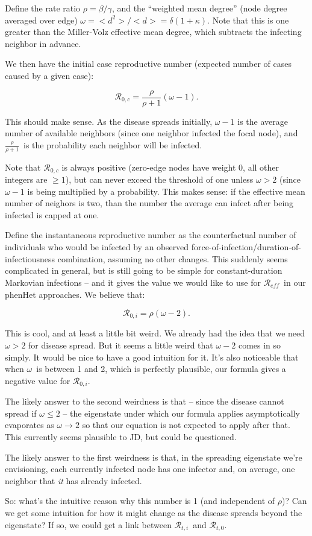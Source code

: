 \documentclass[12pt]{article}
\begin{document}
\newcommand{\Rx}[1]{\ensuremath{\mathcal{R}_{#1}}}
\newcommand{\emd}{\ensuremath{\omega}}
\newcommand{\iprob}{\ensuremath{\frac{\rho}{\rho+1}}}

Define the rate ratio $\rho = \beta/\gamma$, and the “weighted mean degree” (node degree averaged over edge) $\emd = <d^2>/<d> = \delta(1+
\kappa)$. Note that this is one greater than the Miller-Volz effective mean degree, which subtracts the infecting neighbor in advance.

We then have the initial case reproductive number (expected number of cases caused by a given case):

$$ \Rx{0,c} = \iprob(\emd-1). $$

This should make sense. As the disease spreads initially, $\emd - 1$ is the average number of available neighbors (since one neighbor infected the focal node), and \iprob\ is the probability each neighbor will be infected. 

Note that \Rx{0,c} is always positive (zero-edge nodes have weight 0, all other integers are $\geq1$), but can never exceed the threshold of one unless $\emd>2$ (since $\emd-1$ is being multiplied by a probability. This makes sense: if the effective mean number of neighors is two, than the number the average can infect after being infected is capped at one.

Define the instantaneous reproductive number as the counterfactual number of individuals who would be infected by an observed force-of-infection/duration-of-infectiousness combination, assuming no other changes. This suddenly seems complicated in general, but is still going to be simple for constant-duration Markovian infections -- and it gives the value we would like to use for \Rx{\mathit{eff}}\ in our phenHet approaches. We believe that:

$$ \Rx{0,i} = \rho(\emd-2).$$

This is cool, and at least a little bit weird. We already had the idea that we need $\emd>2$ for disease spread. But it seems a little weird that $\emd-2$ comes in so simply. It would be nice to have a good intuition for it. It's also noticeable that when \emd\ is between 1 and 2, which is perfectly plausible, our formula gives a negative value for \Rx{0,i}.

The likely answer to the second weirdness is that -- since the disease cannot spread if $\emd\leq2$ -- the eigenstate under which our formula applies asymptotically evaporates as $\emd\to2$ so that our equation is not expected to apply after that. This currently seems plausible to JD, but could be questioned.

The likely answer to the first weirdness is that, in the spreading eigenstate we're envisioning, each currently infected node has one infector and, on average, one neighbor that \emph{it} has already infected.

So: what's the intuitive reason why this number is 1 (and independent of $\rho$)? Can we get some intuition for how it might change as the disease spreads beyond the eigenstate? If so, we could get a link between \Rx{t,i}\ and \Rx{t,0}.
\end{document}
